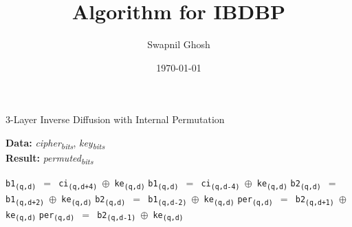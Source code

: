 \documentclass[a4paper]{article}
\title{Algorithm for IBDBP}
\author{Swapnil Ghosh}
\date{\today}
\begin{document}
    \maketitle
    \begin{algorithm}
        \caption{3-Layer Inverse Diffusion with Internal Permutation}
        \hspace*{\algorithmicindent}\textbf{Data: }\textit{cipher\textsubscript{bits}}, \textit{key\textsubscript{bits}} \\
        \hspace*{\algorithmicindent}\textbf{Result: }\textit{permuted\textsubscript{bits}}
        \begin{algorithmic}[1]
                   
                   
                            \State\texttt{b1\textsubscript{(q,d)} $=$ ci\textsubscript{(q,d+4)} $\oplus$ ke\textsubscript{(q,d)}}
                        \Else
                            \State\texttt{b1\textsubscript{(q,d)} $=$ ci\textsubscript{(q,d-4)} $\oplus$ ke\textsubscript{(q,d)}}
                        \EndIf
                    \EndFor
                \EndFor
                   
                            \State\texttt{b2\textsubscript{(q,d)} $=$ b1\textsubscript{(q,d+2)} $\oplus$ ke\textsubscript{(q,d)}}
                        \Else
                            \State\texttt{b2\textsubscript{(q,d)} $=$ b1\textsubscript{(q,d-2)} $\oplus$ ke\textsubscript{(q,d)}}
                        \EndIf
                    \EndFor
                \EndFor
                   
                            \State\texttt{per\textsubscript{(q,d)} $=$ b2\textsubscript{(q,d+1)} $\oplus$ ke\textsubscript{(q,d)}}
                        \Else
                            \State\texttt{per\textsubscript{(q,d)} $=$ b2\textsubscript{(q,d-1)} $\oplus$ ke\textsubscript{(q,d)}}
                        \EndIf
                    \EndFor
                \EndFor
                \State{}            
            \EndProcedure
        \end{algorithmic}
    \end{algorithm}
\end{document}
